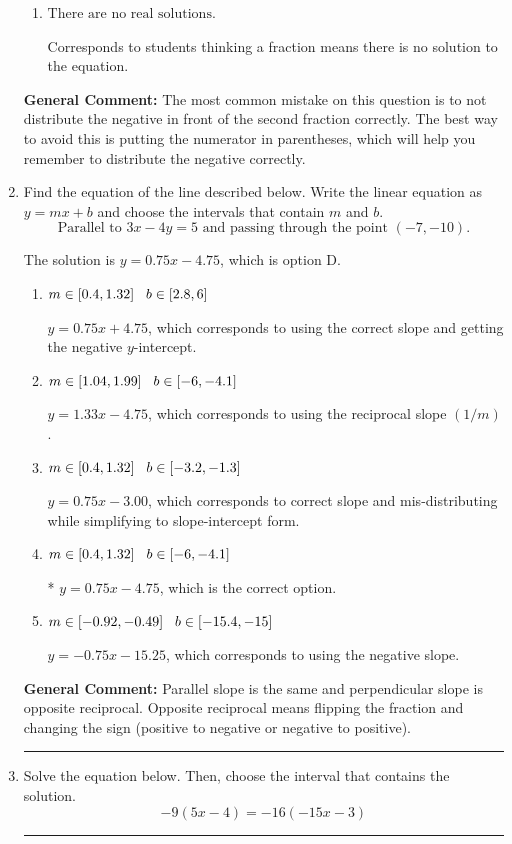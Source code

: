 \documentclass{extbook}[14pt]
\newcommand{\litem}[1]{\item #1

\rule{\textwidth}{0.4pt}}
\begin{document}
\begin{enumerate}
{\begin{enumerate}[label=\Alph*.]
$x = -0.778$, which corresponds to getting the negative of the actual solution.
\item \( \text{There are no real solutions.} \)

Corresponds to students thinking a fraction means there is no solution to the equation.
\end{enumerate}

\textbf{General Comment:} The most common mistake on this question is to not distribute the negative in front of the second fraction correctly. The best way to avoid this is putting the numerator in parentheses, which will help you remember to distribute the negative correctly.
}
\litem{
Find the equation of the line described below. Write the linear equation as $ y=mx+b $ and choose the intervals that contain $m$ and $b$.
\[ \text{Parallel to } 3 x - 4 y = 5 \text{ and passing through the point } (-7, -10). \]

The solution is \( y = 0.75x - 4.75 \), which is option D.\begin{enumerate}[label=\Alph*.]
\item \( m \in [0.4, 1.32] \hspace*{3mm} b \in [2.8, 6] \)

 $y = 0.75x + 4.75$, which corresponds to using the correct slope and getting the negative $y$-intercept.
\item \( m \in [1.04, 1.99] \hspace*{3mm} b \in [-6, -4.1] \)

 $y = 1.33x - 4.75$, which corresponds to using the reciprocal slope $(1/m)$.
\item \( m \in [0.4, 1.32] \hspace*{3mm} b \in [-3.2, -1.3] \)

 $y = 0.75x - 3.00$, which corresponds to correct slope and mis-distributing while simplifying to slope-intercept form.
\item \( m \in [0.4, 1.32] \hspace*{3mm} b \in [-6, -4.1] \)

* $y = 0.75x - 4.75$, which is the correct option.
\item \( m \in [-0.92, -0.49] \hspace*{3mm} b \in [-15.4, -15] \)

 $y = -0.75x - 15.25$, which corresponds to using the negative slope.
\end{enumerate}

\textbf{General Comment:} Parallel slope is the same and perpendicular slope is opposite reciprocal. Opposite reciprocal means flipping the fraction and changing the sign (positive to negative or negative to positive).
}
\litem{
Solve the equation below. Then, choose the interval that contains the solution.
\[ -9(5x -4) = -16(-15x -3) \]

}
\end{enumerate}
\end{document}
